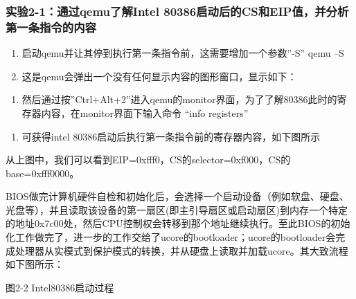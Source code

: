 \subsubsection{实验2-1：通过qemu了解Intel
80386启动后的CS和EIP值，并分析第一条指令的内容}\label{ux5b9eux9a8c2-1ux901aux8fc7qemuux4e86ux89e3intel-80386ux542fux52a8ux540eux7684csux548ceipux503cux5e76ux5206ux6790ux7b2cux4e00ux6761ux6307ux4ee4ux7684ux5185ux5bb9}

\begin{enumerate}
\def\labelenumi{\arabic{enumi}.}
\item
  启动qemu并让其停到执行第一条指令前，这需要增加一个参数''-S'' qemu --S
\item
  这是qemu会弹出一个没有任何显示内容的图形窗口，显示如下：
\end{enumerate}


\begin{enumerate}
\def\labelenumi{\arabic{enumi}.}
\setcounter{enumi}{2}
\item
  然后通过按''Ctrl+Alt+2''进入qemu的monitor界面，为了了解80386此时的寄存器内容，在monitor界面下输入命令
  ``info registers''
\end{enumerate}


\begin{enumerate}
\def\labelenumi{\arabic{enumi}.}
\setcounter{enumi}{3}
\item
  可获得intel 80386启动后执行第一条指令前的寄存器内容，如下图所示
\end{enumerate}


从上图中，我们可以看到EIP=0xfff0，CS的selector=0xf000，CS的base=0xfff0000。

BIOS做完计算机硬件自检和初始化后，会选择一个启动设备（例如软盘、硬盘、光盘等），并且读取该设备的第一扇区(即主引导扇区或启动扇区)到内存一个特定的地址0x7c00处，然后CPU控制权会转移到那个地址继续执行。至此BIOS的初始化工作做完了，进一步的工作交给了ucore的bootloader；ucore的bootloader会完成处理器从实模式到保护模式的转换，并从硬盘上读取并加载ucore。其大致流程如下图所示：


图2-2 Intel80386启动过程
